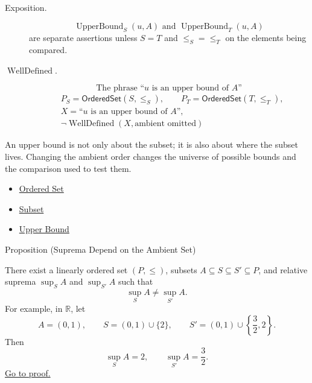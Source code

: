 \begin{remark*}
\begin{description}
  \item[Exposition.]
\[
\operatorname{UpperBound}_S(u,A)
\text{ and }
\operatorname{UpperBound}_T(u,A)
\]
are separate assertions unless $S=T$ and $\le_S=\le_T$ on the elements being compared.


  \item[\(\operatorname{WellDefined}.\)]
  \[
\text{The phrase ``}u\text{ is an upper bound of }A\text{''}
\]
\[
\begin{aligned}
&P_S=\mathsf{OrderedSet}(S,\le_S),\qquad
P_T=\mathsf{OrderedSet}(T,\le_T),\\
&X=\text{``$u$ is an upper bound of $A$''},\\
&\neg\operatorname{WellDefined}(X,\text{ambient omitted})
\end{aligned}
\]
\end{description}
\end{remark*}

\begin{remark*}[Interpretation]
An upper bound is not only about the subset; it is also about where the subset lives. Changing the ambient order changes the universe of possible bounds and the comparison used to test them.
\end{remark*}

\begin{dependencies}
\begin{itemize}
  \item \hyperref[def:ordered-set]{Ordered Set}
  \item \hyperref[def:subset]{Subset}
  \item \hyperref[def:real-upper-bound]{Upper Bound}
\end{itemize}
\end{dependencies}


\begin{propositionbox}{Proposition (Suprema Depend on the Ambient Set)}
\begin{proposition}
\label{prop:suprema-ambient-set}
There exist a linearly ordered set $(P,\leq)$, subsets
$A\subseteq S\subseteq S'\subseteq P$, and relative suprema $\sup_S A$ and
$\sup_{S'}A$ such that
\[
  \sup_S A\ne\sup_{S'}A.
\]
For example, in $\mathbb{R}$, let
\[
  A=(0,1),\qquad
  S=(0,1)\cup\{2\},
  \qquad
  S'=(0,1)\cup\left\{\frac{3}{2},2\right\}.
\]
Then
\[
  \sup_S A=2,
  \qquad
  \sup_{S'}A=\frac{3}{2}.
\]
\hyperref[prf:suprema-ambient-set]{Go to proof.}
\end{proposition}
\end{propositionbox}

